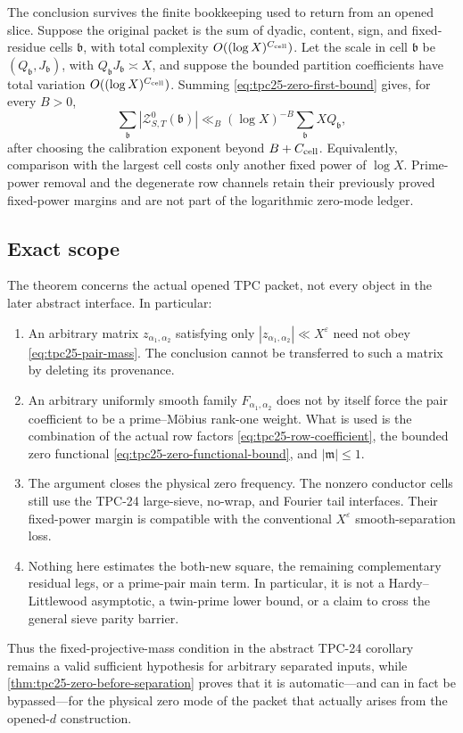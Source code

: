 The conclusion survives the finite bookkeeping used to return from an
opened slice.  Suppose the original packet is the sum of dyadic,
content, sign, and fixed-residue cells \(\mathfrak b\), with total
complexity \(O((\log X)^{C_{\rm cell}})\).  Let the scale in cell
\(\mathfrak b\) be \((Q_{\mathfrak b},J_{\mathfrak b})\), with
\(Q_{\mathfrak b}J_{\mathfrak b}\asymp X\), and suppose the bounded
partition coefficients have total variation
\(O((\log X)^{C_{\rm cell}})\).  Summing
\eqref{eq:tpc25-zero-first-bound} gives, for every \(B>0\),
\begin{equation}
 \sum_{\mathfrak b}|\mathcal Z^0_{S,T}(\mathfrak b)|
 \ll_B
 (\log X)^{-B}
 \sum_{\mathfrak b}XQ_{\mathfrak b},
 \label{eq:tpc25-polylog-reassembly}
\end{equation}
after choosing the calibration exponent beyond
\(B+C_{\rm cell}\).  Equivalently, comparison with the largest cell
costs only another fixed power of \(\log X\).  Prime-power removal and
the degenerate row channels retain their previously proved fixed-power
margins and are not part of the logarithmic zero-mode ledger.

\subsection{Exact scope}

The theorem concerns the actual opened TPC packet, not every object in
the later abstract interface.  In particular:
\begin{enumerate}[label=\textup{(\roman*)}]
 \item An arbitrary matrix \(z_{\alpha_1,\alpha_2}\) satisfying only
 \(|z_{\alpha_1,\alpha_2}|\ll X^\varepsilon\) need not obey
 \eqref{eq:tpc25-pair-mass}.  The conclusion cannot be transferred to
 such a matrix by deleting its provenance.
 \item An arbitrary uniformly smooth family
 \(F_{\alpha_1,\alpha_2}\) does not by itself force the pair
 coefficient to be a prime--M\"obius rank-one weight.  What is used is
 the combination of the actual row factors
 \eqref{eq:tpc25-row-coefficient}, the bounded zero functional
 \eqref{eq:tpc25-zero-functional-bound}, and \(|\mathfrak m|\le1\).
 \item The argument closes the physical zero frequency.  The nonzero
 conductor cells still use the TPC-24 large-sieve, no-wrap, and Fourier
 tail interfaces.  Their fixed-power margin is compatible with the
 conventional \(X^\varepsilon\) smooth-separation loss.
 \item Nothing here estimates the both-new square, the remaining
 complementary residual legs, or a prime-pair main term.  In
 particular, it is not a Hardy--Littlewood asymptotic, a twin-prime
 lower bound, or a claim to cross the general sieve parity barrier.
\end{enumerate}

Thus the fixed-projective-mass condition in the abstract TPC-24
corollary remains a valid sufficient hypothesis for arbitrary
separated inputs, while \cref{thm:tpc25-zero-before-separation} proves
that it is automatic---and can in fact be bypassed---for the physical
zero mode of the packet that actually arises from the opened-\(d\)
construction.

